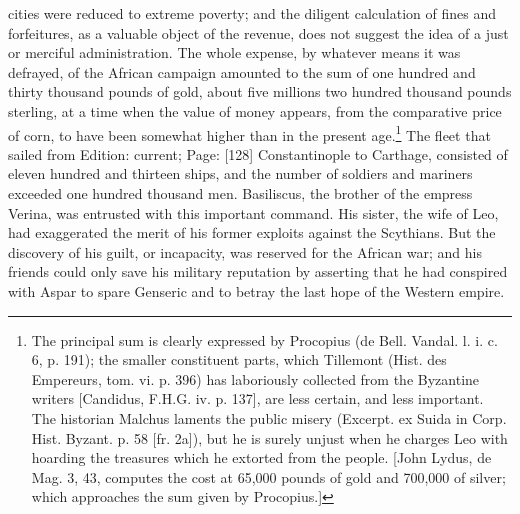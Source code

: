 cities were reduced to extreme poverty; and the diligent calculation of fines and forfeitures, as a valuable object of the revenue, does not suggest the idea of a just or merciful administration. The whole expense, by whatever means it was defrayed, of the African campaign amounted to the sum of one hundred and thirty thousand pounds of gold, about five millions two hundred thousand pounds sterling, at a time when the value of money appears, from the comparative price of corn, to have been somewhat higher than in the present age.\footnote{The principal sum is clearly expressed by Procopius (de Bell. Vandal. l. i. c. 6, p. 191); the smaller constituent parts, which Tillemont (Hist. des Empereurs, tom. vi. p. 396) has laboriously collected from the Byzantine writers [Candidus, F.H.G. iv. p. 137], are less certain, and less important. The historian Malchus laments the public misery (Excerpt. ex Suida in Corp. Hist. Byzant. p. 58 [fr. 2a]), but he is surely unjust when he charges Leo with hoarding the treasures which he extorted from the people. [John Lydus, de Mag. 3, 43, computes the cost at 65,000 pounds of gold and 700,000 of silver; which approaches the sum given by Procopius.]} The fleet that sailed from Edition: current; Page: [128] Constantinople to Carthage, consisted of eleven hundred and thirteen ships, and the number of soldiers and mariners exceeded one hundred thousand men. Basiliscus, the brother of the empress Verina, was entrusted with this important command. His sister, the wife of Leo, had exaggerated the merit of his former exploits against the Scythians. But the discovery of his guilt, or incapacity, was reserved for the African war; and his friends could only save his military reputation by asserting that he had conspired with Aspar to spare Genseric and to betray the last hope of the Western empire.

